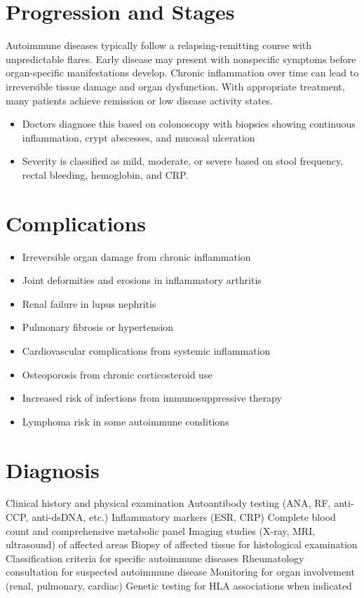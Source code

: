 \section{Progression and Stages}
Autoimmune diseases typically follow a relapsing-remitting course with unpredictable flares. Early disease may present with nonspecific symptoms before organ-specific manifestations develop. Chronic inflammation over time can lead to irreversible tissue damage and organ dysfunction. With appropriate treatment, many patients achieve remission or low disease activity states.

\begin{itemize}[noitemsep]
  \item Doctors diagnose this based on colonoscopy with biopsies showing continuous inflammation, crypt abscesses, and mucosal ulceration
  \item Severity is classified as mild, moderate, or severe based on stool frequency, rectal bleeding, hemoglobin, and CRP.
\end{itemize}
\section{Complications}
\begin{itemize}[noitemsep]
  \item Irreversible organ damage from chronic inflammation
  \item Joint deformities and erosions in inflammatory arthritis
  \item Renal failure in lupus nephritis
  \item Pulmonary fibrosis or hypertension
  \item Cardiovascular complications from systemic inflammation
  \item Osteoporosis from chronic corticosteroid use
  \item Increased risk of infections from immunosuppressive therapy
  \item Lymphoma risk in some autoimmune conditions
\end{itemize}
\section{Diagnosis}
Clinical history and physical examination Autoantibody testing (ANA, RF, anti-CCP, anti-dsDNA, etc.) Inflammatory markers (ESR, CRP) Complete blood count and comprehensive metabolic panel Imaging studies (X-ray, MRI, ultrasound) of affected areas Biopsy of affected tissue for histological examination Classification criteria for specific autoimmune diseases Rheumatology consultation for suspected autoimmune disease Monitoring for organ involvement (renal, pulmonary, cardiac) Genetic testing for HLA associations when indicated

